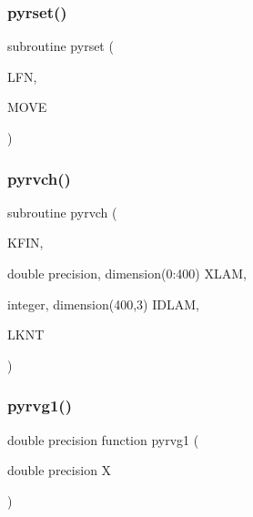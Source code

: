 \subsubsection{\texorpdfstring{pyrset()}{pyrset()}}
{\footnotesize\ttfamily subroutine pyrset (\begin{DoxyParamCaption}\item[{}]{L\+FN,  }\item[{}]{M\+O\+VE }\end{DoxyParamCaption})}

\mbox{\label{pythia-6_84_824_8f_a7452e5c7a826962ce1c001af995ed6ef}} 
\subsubsection{\texorpdfstring{pyrvch()}{pyrvch()}}
{\footnotesize\ttfamily subroutine pyrvch (\begin{DoxyParamCaption}\item[{}]{K\+F\+IN,  }\item[{double precision, dimension(0\+:400)}]{X\+L\+AM,  }\item[{integer, dimension(400,3)}]{I\+D\+L\+AM,  }\item[{}]{L\+K\+NT }\end{DoxyParamCaption})}

\mbox{\label{pythia-6_84_824_8f_a2fc031269f435aa5547d90d480213f0d}} 
\subsubsection{\texorpdfstring{pyrvg1()}{pyrvg1()}}
{\footnotesize\ttfamily double precision function pyrvg1 (\begin{DoxyParamCaption}\item[{double precision}]{X }\end{DoxyParamCaption})}

\mbox{\label{pythia-6_84_824_8f_a371f64ca765777a5a87c152e18482a4a}} 
